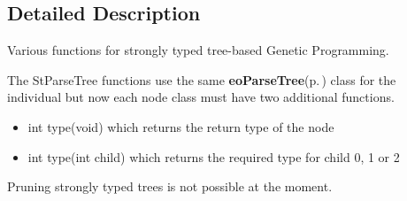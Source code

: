 \subsection{Detailed Description}
Various functions for strongly typed tree-based Genetic Programming. 

The St\-Parse\-Tree functions use the same {\bf eo\-Parse\-Tree}{\rm (p.\,\pageref{classeo_parse_tree})} class for the individual but now each node class must have two additional functions. \begin{itemize}
\item int type(void) which returns the return type of the node \item int type(int child) which returns the required type for child 0, 1 or 2\end{itemize}
Pruning strongly typed trees is not possible at the moment. 